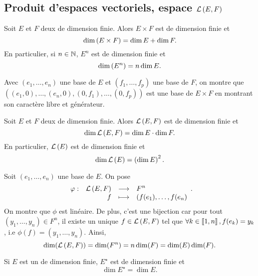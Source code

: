 \documentclass{magnolia}
\begin{document}
\subsection{Produit d'espaces vectoriels, espace $\mathcal{L}\left(E,F\right)$}


\begin{proposition}[utile=-2]
Soit $E$ et $F$ deux \Kevs de dimension finie. Alors $E\times F$ est de
dimension finie et
\[\dim\left(E\times F\right)=\dim E+\dim F.\]
En particulier, si $n\in\mathbb{N}$, $E^n$ est de dimension finie et
\[\dim\left(E^n\right)=n\dim E.\]
\end{proposition}

\begin{preuve}
Avec $(e_1,\ldots,e_n)$ une base de $E$ et $(f_1,\ldots,f_p)$ une base de $F$, on montre que \\$((e_1,0),\ldots,(e_n,0),(0,f_1),\ldots,(0,f_p))$ est une base de $E\times F$ en montrant son caractère libre et générateur.
\end{preuve}

\begin{proposition}[utile=-3]
Soit $E$ et $F$ deux \Kevs de dimension finie. Alors $\mathcal{L}\left(E,F\right)$ est de
dimension finie et
\[\dim\mathcal{L}\left(E,F\right)=\dim E\cdot\dim F.\]
En particulier, $\mathcal{L}\left(E\right)$ est de dimension finie et
\[\dim\mathcal{L}\left(E\right)=\left(\dim E\right)^2.\]
\end{proposition}

\begin{preuve}
Soit $(e_1,\ldots,e_n)$ une base de $E$. On pose $$\begin{array}[t]{lrcl} \displaystyle{\varphi} : & \displaystyle{\mathcal{L}\left(E,F\right)} & \longrightarrow & \displaystyle{F^n} \\ & \displaystyle{f} & \longmapsto & \displaystyle{(f(e_1),\ldots,f(e_n)} \end{array}.$$
On montre que $\phi$ est linéaire. De plus, c'est une bijection car pour tout $(y_1,\ldots,y_n)\in F^n$, il existe un unique $f\in \mathcal{L}\left(E,F\right)$ tel que $\forall k \in \left\llbracket 1,n\right\rrbracket, f(e_k)=y_k$, i.e $\phi(f)=(y_1,\ldots,y_n)$.
Ainsi, $$\dim(\mathcal{L}\left(E,F\right))=\dim(F^n)=n\dim(F)=\dim(E)\dim(F).$$
\end{preuve}

\begin{proposition}[utile=-1]
Si $E$ est un \Kev de dimension finie, $E^\star$ est de dimension finie et
\[\dim E^\star=\dim E.\]
\end{proposition}
\end{document}
